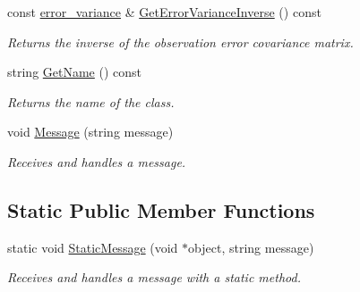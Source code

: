 \documentclass{tufte-book}
\begin{document}
\begin{DoxyCompactItemize}
const \hyperlink{class_verdandi_1_1_observation_manager_template_a6c945c41f11fb91cf83a2535b7516cc2}{error\-\_\-variance} \& \hyperlink{class_verdandi_1_1_observation_manager_template_a96022ffb205eea2dc4ed9c435b14d250}{\-Get\-Error\-Variance\-Inverse} () const
\begin{DoxyCompactList}\small\item\em \-Returns the inverse of the observation error covariance matrix. \end{DoxyCompactList}\item
string \hyperlink{class_verdandi_1_1_observation_manager_template_af140e2b090625126991ae3eae6ffb0e9}{\-Get\-Name} () const
\begin{DoxyCompactList}\small\item\em \-Returns the name of the class. \end{DoxyCompactList}\item
\hypertarget{class_verdandi_1_1_observation_manager_template_a93b7d2115d7166b58d6e1ba573fc5fc7}{
void \hyperlink{class_verdandi_1_1_observation_manager_template_a93b7d2115d7166b58d6e1ba573fc5fc7}{\-Message} (string message)}
\label{class_verdandi_1_1_observation_manager_template_a93b7d2115d7166b58d6e1ba573fc5fc7}

\begin{DoxyCompactList}\small\item\em \-Receives and handles a message. \end{DoxyCompactList}\end{DoxyCompactItemize}
\subsection{\-Static \-Public \-Member \-Functions}
\begin{DoxyCompactItemize}
\item
\hypertarget{class_verdandi_1_1_verdandi_base_a6dcc96ec9661a4cbf152955adb9dc990}{
static void \hyperlink{class_verdandi_1_1_verdandi_base_a6dcc96ec9661a4cbf152955adb9dc990}{\-Static\-Message} (void $\ast$object, string message)}
\label{class_verdandi_1_1_verdandi_base_a6dcc96ec9661a4cbf152955adb9dc990}

\begin{DoxyCompactList}\small\item\em \-Receives and handles a message with a static method. \end{DoxyCompactList}\end{DoxyCompactItemize}
\end{document}
